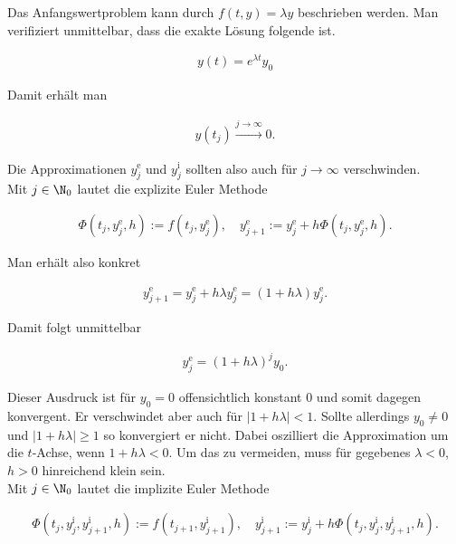 \begin{solution}

Das Anfangswertproblem kann durch $f(t, y) = \lambda y$ beschrieben werden. Man verifiziert unmittelbar, dass die exakte Lösung folgende ist.

\begin{align*}
  y(t) = e^{\lambda t} y_0
\end{align*}

Damit erhält man

\begin{align*}
  y(t_j) \xrightarrow{j \to \infty} 0.
\end{align*}

Die Approximationen $y_j^{\mathrm{e}}$ und $y_j^{\mathrm{i}}$ sollten also auch für $j \to \infty$ verschwinden. \\

Mit $j \in \N_0$ lautet die explizite Euler Methode

\begin{align*}
  \Phi(t_j, y_j^{\mathrm{e}}, h) := f(t_j, y_j^{\mathrm{e}}),
  \quad
  y_{j+1}^{\mathrm{e}} := y_j^{\mathrm{e}} + h \Phi(t_j, y_j^{\mathrm{e}}, h).
\end{align*}

Man erhält also konkret

\begin{align*}
  y_{j+1}^{\mathrm{e}}
  =
  y_j^{\mathrm{e}} + h \lambda y_j^{\mathrm{e}}
  =
  (1 + h \lambda) y_j^{\mathrm{e}}.
\end{align*}

Damit folgt unmittelbar

\begin{align*}
  y_j^{\mathrm{e}}
  =
  (1 + h \lambda)^j y_0.
\end{align*}

Dieser Ausdruck ist für $y_0 = 0$ offensichtlich konstant $0$ und somit dagegen konvergent.
Er verschwindet aber auch für $|1 + h \lambda| < 1$.
Sollte allerdings $y_0 \neq 0$ und $|1 + h \lambda| \geq 1$ so konvergiert er nicht.
Dabei oszilliert die Approximation um die $t$-Achse, wenn $1 + h \lambda < 0$.
Um das zu vermeiden, muss für gegebenes $\lambda < 0$, $h > 0$ hinreichend klein sein. \\

Mit $j \in \N_0$ lautet die implizite Euler Methode

\begin{align*}
  \Phi(t_j, y_j^{\mathrm{i}}, y_{j+1}^{\mathrm{i}}, h) := f(t_{j+1}, y_{j+1}^{\mathrm{i}}),
  \quad
  y_{j+1}^{\mathrm{i}} := y_j^{\mathrm{i}} + h \Phi(t_j, y_j^{\mathrm{i}}, y_{j+1}^{\mathrm{i}}, h).
\end{align*}


\end{solution}

